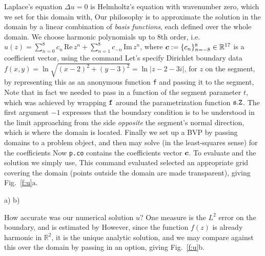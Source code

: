 \documentclass[11pt]{article}
\begin{document}
Laplace's equation $\Delta u = 0$ is Helmholtz's equation with wavenumber
zero, which we set for this domain with,
Our philosophy is
to approximate the solution in the domain by a linear combination of
{\em basis functions}, each defined over the whole domain.
We choose harmonic polynomials up to 8th order,
i.e. $u(z) = \sum_{n=0}^{8} c_n \,\mbox{Re}\,z^n +
\sum_{n=1}^{8} c_{-n}\,\mbox{Im}\,z^n$, where ${\bm c}:=\{c_n\}_{n=-8}^{8}
\in\mathbb{R}^{17}$
is a coefficient vector,
using the command
Let's specify Dirichlet boundary data $f(x,y) = \ln \sqrt{(x-2)^2+(y-3)^2} =
\ln |z-2-3i|$, for
$z$ on the segment, by representing this as an anonymous function {\tt f}
and passing it to the segment,
Note that in fact we needed to pass in a function of the segment parameter $t$,
which was achieved by
wrapping ${\tt f}$ around the parametrization function ${\tt s.Z}$.
The first argument $-1$ expresses that the boundary condition is to be
understood in the limit approaching from the side {\em opposite} the
segment's normal direction, which is where the domain is located.
Finally we set up a BVP by passing domains to a problem object, and then
may solve (in the least-squares sense) for the coefficients
Now {\tt p.co} contains the coefficients vector ${\bm c}$.
To evaluate and the solution we simply use,
This command evaluated selected an appropriate grid covering the domain
(points outside the domain are made transparent), giving Fig.~\ref{f:u}a.

\bfi %
a)
b)
\efi

How accurate was our numerical solution $u$? One measure is the
$L^2$ error on the boundary, and is estimated by
However, since the function $f(z)$ is already harmonic in $\mathbb{R}^2$,
it is the unique analytic solution, and we may compare against this
over the domain by passing in an option,
giving Fig.~\ref{f:u}b.
\end{document}
